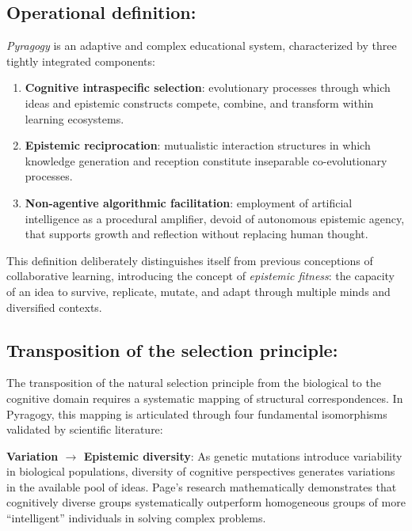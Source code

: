 \subsection{Operational definition:}

\begin{definition}[Pyragogy]
	\label{def:pyragogy}
	\textit{Pyragogy} is an adaptive and complex educational system, characterized by three tightly integrated components:
	\begin{enumerate}
		\item \textbf{Cognitive intraspecific selection}: evolutionary processes through which ideas and epistemic constructs compete, combine, and transform within learning ecosystems.
		\item \textbf{Epistemic reciprocation}: mutualistic interaction structures in which knowledge generation and reception constitute inseparable co-evolutionary processes.
		\item \textbf{Non-agentive algorithmic facilitation}: employment of artificial intelligence as a procedural amplifier, devoid of autonomous epistemic agency, that supports growth and reflection without replacing human thought.
	\end{enumerate}
	This definition deliberately distinguishes itself from previous conceptions of collaborative learning, introducing the concept of \textit{epistemic fitness}: the capacity of an idea to survive, replicate, mutate, and adapt through multiple minds and diversified contexts.
\end{definition}

\subsection{Transposition of the selection principle:}

The transposition of the natural selection principle from the biological to the cognitive domain requires a systematic mapping of structural correspondences. In Pyragogy, this mapping is articulated through four fundamental isomorphisms validated by scientific literature:

\textbf{Variation $\rightarrow$ Epistemic diversity}: As genetic mutations introduce variability in biological populations, diversity of cognitive perspectives generates variations in the available pool of ideas. Page's research \cite{Page2007} mathematically demonstrates that cognitively diverse groups systematically outperform homogeneous groups of more ``intelligent'' individuals in solving complex problems.

